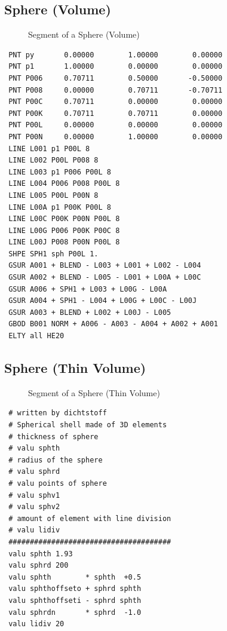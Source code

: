 \documentclass{article}
\begin{document}
\begin{appendix}
\subsection{\label{Sphere (Volume)}Sphere (Volume)}
\begin{figure}[h]
\caption{\label{Segment of a SphereV}Segment of a Sphere (Volume)}
\end{figure}
\begin{verbatim}
 PNT py       0.00000        1.00000        0.00000 
 PNT p1       1.00000        0.00000        0.00000 
 PNT P006     0.70711        0.50000       -0.50000 
 PNT P008     0.00000        0.70711       -0.70711 
 PNT P00C     0.70711        0.00000        0.00000 
 PNT P00K     0.70711        0.70711        0.00000 
 PNT P00L     0.00000        0.00000        0.00000 
 PNT P00N     0.00000        1.00000        0.00000 
 LINE L001 p1 P00L 8              
 LINE L002 P00L P008 8              
 LINE L003 p1 P006 P00L 8              
 LINE L004 P006 P008 P00L 8              
 LINE L005 P00L P00N 8              
 LINE L00A p1 P00K P00L 8              
 LINE L00C P00K P00N P00L 8              
 LINE L00G P006 P00K P00C 8              
 LINE L00J P008 P00N P00L 8              
 SHPE SPH1 sph P00L 1.
 GSUR A001 + BLEND - L003 + L001 + L002 - L004 
 GSUR A002 + BLEND - L005 - L001 + L00A + L00C 
 GSUR A006 + SPH1 + L003 + L00G - L00A 
 GSUR A004 + SPH1 - L004 + L00G + L00C - L00J 
 GSUR A003 + BLEND + L002 + L00J - L005 
 GBOD B001 NORM + A006 - A003 - A004 + A002 + A001 
 ELTY all HE20 
\end{verbatim}


\subsection{\label{Sphere (Thin Volume)}Sphere (Thin Volume)}
\begin{figure}[h]
\caption{\label{Segment of a Sphere (Thin Volume)}Segment of a Sphere (Thin Volume)}
\end{figure}
\begin{verbatim}
 # written by dichtstoff
 # Spherical shell made of 3D elements
 # thickness of sphere
 # valu sphth 
 # radius of the sphere
 # valu sphrd 
 # valu points of sphere 
 # valu sphv1 
 # valu sphv2 
 # amount of element with line division
 # valu lidiv 
 ######################################
 valu sphth 1.93
 valu sphrd 200 
 valu sphth        * sphth  +0.5
 valu sphthoffseto + sphrd sphth 
 valu sphthoffseti - sphrd sphth
 valu sphrdn       * sphrd  -1.0
 valu lidiv 20


\end{verbatim}
\end{appendix}
\end{document}

